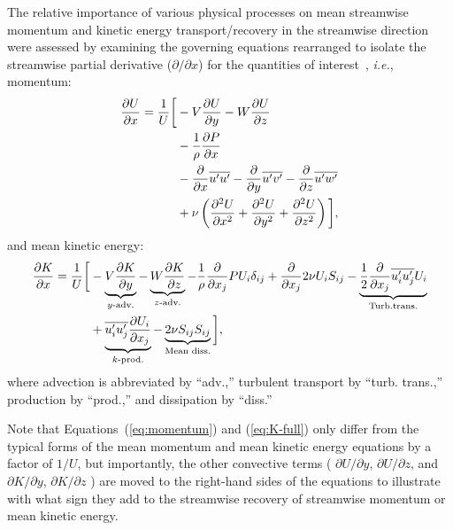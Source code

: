 \documentclass[energies,article,accept,moreauthors,pdftex,10pt,a4paper]{mdpi}
\def \p{\partial}
\theoremstyle{mdpi}
\newcounter{ex}
\newcounter{re}
\begin{document}
The relative importance of various physical processes on mean streamwise
momentum and kinetic energy transport/recovery in the streamwise direction were
assessed by examining the governing equations rearranged to isolate the
streamwise partial derivative ($\partial / \partial x$) for the quantities of
interest~\cite{Bachant2015-JoT}, \emph{i.e.}, momentum:
\begin{equation}
	\begin{split}
		\frac{\p U}{\p x} = 
		\frac{1}{U} \bigg{[}
		& - V\frac{\p U}{\p y}
		- W\frac{\p U}{\p z} \\
		& -\frac{1}{\rho}\frac{\p P}{\p x} \\
		& - \frac{\p}{\p x} \overline{u'u'}
		- \frac{\p}{\p y} \overline{u'v'}
		- \frac{\p}{\p z} \overline{u'w'} \\
		& + \nu\left(\frac{\p^2 U}{\p x^2}
		+ \frac{\p^2 U}{\p y^2}
		+ \frac{\p^2 U}{\p z^2} \right)
		\bigg{]},
	\end{split}
	\label{eq:momentum}
\end{equation}
and mean kinetic energy:
\begin{equation}
	\begin{split}
		\frac{\p K}{\p x}
		=
		\frac{1}{U}
		\bigg{[}
		& - \underbrace{V \frac{\p K}{\p y}}_{y\text{-adv.%
		}}
		- \underbrace{W \frac{\p K}{\p z}}_{z\text{-adv.}}
		- \frac{1}{\rho}\frac{\p}{\p x_j} P U_i \delta_{ij}
		+ \frac{\p}{\p x_j} 2 \nu U_i S_{ij} %
		- \underbrace{
		\frac{1}{2}\frac{\p}{\p x_j} \overline{u_i' u_j'} U_i
		}_{\text{Turb.%
		trans.%
		}} \\
		& + 
		\underbrace{
		\overline{u_i' u_j'} \frac{\p U_i}{\p x_j}
		}_{k\text{-prod.%
		}}
		- 
		\underbrace{
		2 \nu S_{ij}S_{ij}
		}_{\text{Mean diss.%
		}}
		\bigg{]},
	\label{eq:K-full}
	\end{split}
\end{equation}
where advection is abbreviated by ``adv.,'' turbulent transport by ``turb.
trans.,'' production by ``prod.,'' and dissipation by ``diss.''

Note that Equations~(\ref{eq:momentum}) and (\ref{eq:K-full}) only differ from
the typical forms of the mean momentum and mean kinetic energy equations by a
factor of $1/U$, but importantly, the other convective terms ( $\partial
U/\partial y$, $\partial U/\partial z$, and $\partial K/\partial y$, $\partial
K/\partial z$ ) are moved to the right-hand sides of the equations to illustrate
with what sign they add to the streamwise recovery of streamwise momentum or
mean kinetic energy.
\end{document}
